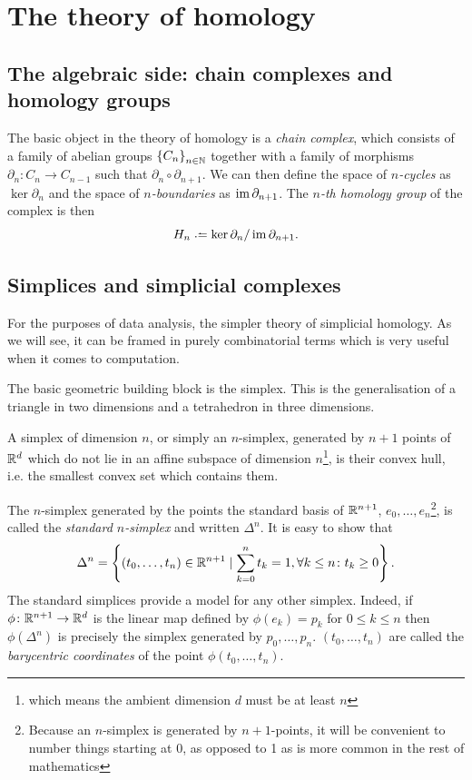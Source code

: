 \documentclass[../main.tex]{subfiles}
\begin{document}
\section{The theory of homology}

\subsection{The algebraic side: chain complexes and homology groups}
The basic object in the theory of homology is a \emph{chain complex}, which consists of a
family of abelian groups \( \left\{ C_n \right\}_{n \in \mathbb{N}} \) together with a family of morphisms \(
\partial_n \colon C_n \to C_{n-1} \) such that \( \partial_n \circ \partial_{n+1} \). We
can then define the space of \emph{\( n \)-cycles} as \( \ker{\partial_n} \) and the space
of \emph{\( n \)-boundaries} as \( \operatorname{im}{\partial_{n+1}} \). The \emph{\( n \)-th homology group}
of the complex is then
\begin{equation*}
	H_n \defeq \ker{\partial_n} / \im{\partial_{n+1}}. 
\end{equation*}

\subsection{Simplices and simplicial complexes}
For the purposes of data analysis, the simpler theory of simplicial homology. As we will
see, it can be framed in purely combinatorial terms which is very useful when it comes to
computation. 

The basic geometric building block is the simplex. This is the generalisation of a
triangle in two dimensions and a tetrahedron in three dimensions. 

\begin{definition}[Simplex]\label{def:simplex}
	A simplex of dimension \( n \), or simply an \( n \)-simplex, generated by \( n+1 \)
	points of \( \mathbb{R}^d \) which do not lie in an affine subspace of dimension \( n
	\)\footnote{which means the ambient dimension \( d \) must be at least \( n \)}, is
	their convex hull, i.e. the smallest convex set which contains them.
\end{definition}

The \( n \)-simplex generated by the points the standard basis of \( \mathbb{R}^{n+1} \), \( e_0,
\dots, e_n \)\footnote{Because an \( n \)-simplex is generated by \( n+1 \)-points, it
will be convenient to number things starting at 0, as opposed to 1 as is more common in
the rest of mathematics}, is called the \emph{standard \( n \)-simplex} and
written \( \Delta^n \). It is easy to show that
\begin{equation*}
	\Delta^n = \left\{ (t_0, \dots, t_n) \in \mathbb{R}^{n+1} \mid \sum_{k = 0}^{n} t_k = 1, \forall k
	\leq n \colon t_k \geq 0 \right\}. 
\end{equation*}
The standard simplices provide a model for any other simplex. Indeed, if \( \phi \colon
\mathbb{R}^{n+1} \to \mathbb{R}^d \) is the linear map defined by \( \phi(e_k) = p_k \) for \( 0 \leq k
\leq n \) then \( \phi(\Delta^n) \) is precisely the simplex generated by \( p_0, \dots,
p_n \). \( (t_0, \dots, t_n) \) are called the \emph{barycentric coordinates} of the point
\( \phi(t_0, \dots, t_n) \). 
\end{document}
